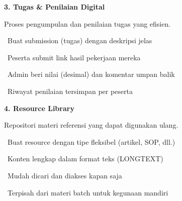 \documentclass[a4paper]{article}
\begin{document}
\vspace{8pt}

\noindent
\begin{minipage}[t]{0.485\textwidth}
    \colorbox{EmeraldPrimary}{%
        \begin{minipage}{\dimexpr\textwidth-14pt}
            \vspace{5pt}
            {\fontsize{10}{13}\selectfont\bfseries\color{White} 3. Tugas \& Penilaian Digital}
            \vspace{5pt}
        \end{minipage}}
    \vspace{5pt}
    {\fontsize{9}{12}\selectfont\color{TextDark}%
    Proses pengumpulan dan penilaian tugas yang efisien.\par\vspace{3pt}
    \textbullet\ Buat submission (tugas) dengan deskripsi jelas\par\vspace{2pt}%
    \textbullet\ Peserta submit link hasil pekerjaan mereka\par\vspace{2pt}%
    \textbullet\ Admin beri nilai (desimal) dan komentar umpan balik\par\vspace{2pt}%
    \textbullet\ Riwayat penilaian tersimpan per peserta}%
\end{minipage}%
\hfill
\begin{minipage}[t]{0.485\textwidth}
    \colorbox{PurplePrimary}{%
        \begin{minipage}{\dimexpr\textwidth-14pt}
            \vspace{5pt}
            {\fontsize{10}{13}\selectfont\bfseries\color{White} 4. Resource Library}
            \vspace{5pt}
        \end{minipage}}
    \vspace{5pt}
    {\fontsize{9}{12}\selectfont\color{TextDark}%
    Repositori materi referensi yang dapat digunakan ulang.\par\vspace{3pt}
    \textbullet\ Buat resource dengan tipe fleksibel (artikel, SOP, dll.)\par\vspace{2pt}%
    \textbullet\ Konten lengkap dalam format teks (LONGTEXT)\par\vspace{2pt}%
    \textbullet\ Mudah dicari dan diakses kapan saja\par\vspace{2pt}%
    \textbullet\ Terpisah dari materi batch untuk kegunaan mandiri}%
\end{minipage}
\end{document}
